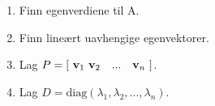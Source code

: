 \begin{enumerate}
  \item Finn egenverdiene til A.
  \item Finn lineært uavhengige egenvektorer.
  \item Lag $P = [\ \mathbf{v}_1\ \mathbf{v}_2 \quad ... \quad \mathbf{v}_n\ ]$.
  \item Lag $D = \text{diag}(\lambda_1, \lambda_2, ..., \lambda_n)$.
\end{enumerate}
